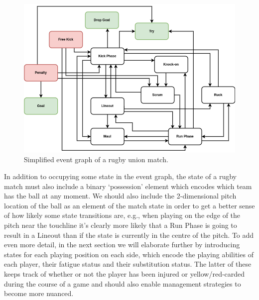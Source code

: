 \begin{figure}[h]
\includegraphics[width=14cm]{images/trywizard-event-graph.drawio.png}
\caption{Simplified event graph of a rugby union match.}
\label{fig:event-graph}
\end{figure}

In addition to occupying some state in the event graph, the state of a rugby match must also include a binary `possession' element which encodes which team has the ball at any moment. We should also include the 2-dimensional pitch location of the ball as an element of the match state in order to get a better sense of how likely some state transitions are, e.g., when playing on the edge of the pitch near the touchline it's clearly more likely that a {\sf Run Phase} is going to result in a {\sf Lineout} than if the state is currently in the centre of the pitch. To add even more detail, in the next section we will elaborate further by introducing states for each playing position on each side, which encode the playing abilities of each player, their fatigue status and their substitution status. The latter of these keeps track of whether or not the player has been injured or yellow/red-carded during the course of a game and should also enable management strategies to become more nuanced.

